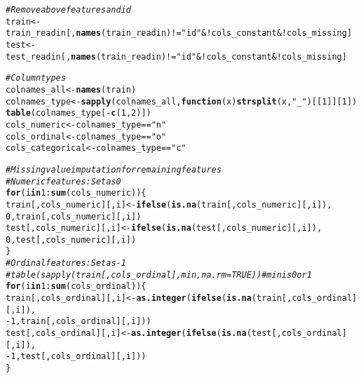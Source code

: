 \documentclass{article}\usepackage[]{graphicx}\usepackage[]{color}
\makeatletter
\newcommand{\hlnum}[1]{\textcolor[rgb]{0.686,0.059,0.569}{#1}}%
\newcommand{\hlstr}[1]{\textcolor[rgb]{0.192,0.494,0.8}{#1}}%
\newcommand{\hlcom}[1]{\textcolor[rgb]{0.678,0.584,0.686}{\textit{#1}}}%
\newcommand{\hlopt}[1]{\textcolor[rgb]{0,0,0}{#1}}%
\newcommand{\hlstd}[1]{\textcolor[rgb]{0.345,0.345,0.345}{#1}}%
\newcommand{\hlkwa}[1]{\textcolor[rgb]{0.161,0.373,0.58}{\textbf{#1}}}%
\newcommand{\hlkwb}[1]{\textcolor[rgb]{0.69,0.353,0.396}{#1}}%
\newcommand{\hlkwc}[1]{\textcolor[rgb]{0.333,0.667,0.333}{#1}}%
\newcommand{\hlkwd}[1]{\textcolor[rgb]{0.737,0.353,0.396}{\textbf{#1}}}%
\newenvironment{kframe}{%
 \def\at@end@of@kframe{}%
 \ifinner\ifhmode%
  \def\at@end@of@kframe{\end{minipage}}%
  \begin{minipage}{\columnwidth}%
 \fi\fi%
 \def\FrameCommand##1{\hskip\@totalleftmargin \hskip-\fboxsep
 \colorbox{shadecolor}{##1}\hskip-\fboxsep
     \hskip-\linewidth \hskip-\@totalleftmargin \hskip\columnwidth}%
 \MakeFramed {\advance\hsize-\width
   \@totalleftmargin\z@ \linewidth\hsize
   \@setminipage}}%
 {\par\unskip\endMakeFramed%
 \at@end@of@kframe}
\newenvironment{knitrout}{}{} %
\makeatother
\begin{document}
\begin{knitrout}
\begin{kframe}
\begin{alltt}
\hlcom{# Remove above features and id}
\hlstd{train} \hlkwb{<-} \hlstd{train_readin[,} \hlkwd{names}\hlstd{(train_readin)} \hlopt{!=} \hlstr{"id"} \hlopt{& !}\hlstd{cols_constant} \hlopt{& !}\hlstd{cols_missing]}
\hlstd{test} \hlkwb{<-} \hlstd{test_readin[,} \hlkwd{names}\hlstd{(train_readin)} \hlopt{!=} \hlstr{"id"} \hlopt{& !}\hlstd{cols_constant} \hlopt{& !}\hlstd{cols_missing]}

\hlcom{# Column types}
\hlstd{colnames_all} \hlkwb{<-} \hlkwd{names}\hlstd{(train)}
\hlstd{colnames_type} \hlkwb{<-} \hlkwd{sapply}\hlstd{(colnames_all,} \hlkwa{function}\hlstd{(}\hlkwc{x}\hlstd{)} \hlkwd{strsplit}\hlstd{(x,} \hlstr{"_"}\hlstd{)[[}\hlnum{1}\hlstd{]][}\hlnum{1}\hlstd{])}
\hlkwd{table}\hlstd{(colnames_type[}\hlopt{-}\hlkwd{c}\hlstd{(}\hlnum{1}\hlstd{,} \hlnum{2}\hlstd{)])}
\hlstd{cols_numeric} \hlkwb{<-} \hlstd{colnames_type} \hlopt{==} \hlstr{"n"}
\hlstd{cols_ordinal} \hlkwb{<-} \hlstd{colnames_type} \hlopt{==} \hlstr{"o"}
\hlstd{cols_categorical} \hlkwb{<-} \hlstd{colnames_type} \hlopt{==} \hlstr{"c"}

\hlcom{# Missing value imputation for remaining features}
\hlcom{# Numeric features: Set as 0}
\hlkwa{for} \hlstd{(i} \hlkwa{in} \hlnum{1}\hlopt{:}\hlkwd{sum}\hlstd{(cols_numeric)) \{}
  \hlstd{train[, cols_numeric][, i]} \hlkwb{<-} \hlkwd{ifelse}\hlstd{(}\hlkwd{is.na}\hlstd{(train[, cols_numeric][, i]),}
                                       \hlnum{0}\hlstd{, train[, cols_numeric][, i])}
  \hlstd{test[, cols_numeric][, i]} \hlkwb{<-} \hlkwd{ifelse}\hlstd{(}\hlkwd{is.na}\hlstd{(test[, cols_numeric][, i]),}
                                      \hlnum{0}\hlstd{, test[, cols_numeric][, i])}
\hlstd{\}}
\hlcom{# Ordinal features: Set as -1}
\hlcom{# table(sapply(train[, cols_ordinal], min, na.rm = TRUE)) # min is 0 or 1}
\hlkwa{for} \hlstd{(i} \hlkwa{in} \hlnum{1}\hlopt{:}\hlkwd{sum}\hlstd{(cols_ordinal)) \{}
  \hlstd{train[, cols_ordinal][, i]} \hlkwb{<-} \hlkwd{as.integer}\hlstd{(}\hlkwd{ifelse}\hlstd{(}\hlkwd{is.na}\hlstd{(train[, cols_ordinal][, i]),}
                                              \hlopt{-}\hlnum{1}\hlstd{, train[, cols_ordinal][, i]))}
  \hlstd{test[, cols_ordinal][, i]} \hlkwb{<-} \hlkwd{as.integer}\hlstd{(}\hlkwd{ifelse}\hlstd{(}\hlkwd{is.na}\hlstd{(test[, cols_ordinal][, i]),}
                                             \hlopt{-}\hlnum{1}\hlstd{, test[, cols_ordinal][, i]))}
\hlstd{\}}


\end{alltt}
\end{kframe}
\end{knitrout}
\end{document}
